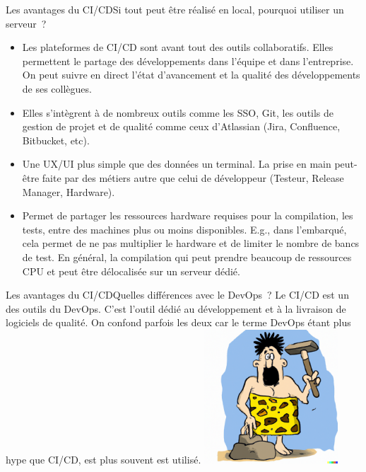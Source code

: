 \documentclass{beamer}
\begin{document}
    \begin{frame}{Les avantages du CI/CD}{Si tout peut être réalisé en local, pourquoi utiliser un serveur~?}
        \transdissolve
        \begin{itemize}
            \item Les plateformes de CI/CD sont avant tout des outils collaboratifs.
            Elles permettent le partage des développements dans l'équipe et dans l'entreprise.
            On peut suivre en direct l'état d'avancement et la qualité des développements de ses collègues.
            \item Elles s'intègrent à de nombreux outils comme les SSO, Git, les outils de gestion de projet et de qualité comme ceux d'Atlassian (Jira, Confluence, Bitbucket, etc).
            \item Une UX/UI plus simple que des données un terminal.
            La prise en main peut-être faite par des métiers autre que celui de développeur (Testeur, Release Manager, Hardware).
            \item Permet de partager les ressources hardware requises pour la compilation, les tests, entre des machines plus ou moins disponibles.
            E.g., dans l'embarqué, cela permet de ne pas multiplier le hardware et de limiter le nombre de bancs de test.
            En général, la compilation qui peut prendre beaucoup de ressources CPU et peut être délocalisée sur un serveur dédié.
        \end{itemize}
    \end{frame}

    \begin{frame}{Les avantages du CI/CD}{Quelles différences avec le DevOps~?}
        \transdissolve
        Le CI/CD est un des outils du DevOps.
        \bigbreak
        C'est l'outil dédié au développement et à la livraison de logiciels de qualité.
        On confond parfois les deux car le terme DevOps étant plus hype que CI/CD, est plus souvent est utilisé.
        \bigbreak
        \centering
        \includegraphics[width=5cm]{image/caveman-using-a-sophisticated-tool}
    \end{frame}
\end{document}
